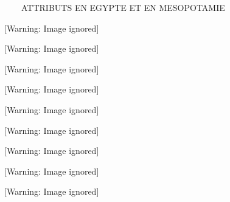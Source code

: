 \documentclass{article}
\title{}
\begin{document}
\ \ \ \ ATTRIBUTS EN EGYPTE ET EN MESOPOTAMIE\ \ 

\begin{center}
 [Warning: Image ignored] %

\end{center}
\begin{center}
 [Warning: Image ignored] %

\end{center}
\begin{center}
 [Warning: Image ignored] %

\end{center}
\begin{center}
 [Warning: Image ignored] %

\end{center}
\begin{center}
 [Warning: Image ignored] %

\end{center}
\begin{center}
 [Warning: Image ignored] %

\end{center}
\begin{center}
 [Warning: Image ignored] %

\end{center}
\begin{center}
 [Warning: Image ignored] %

\end{center}
\begin{center}
 [Warning: Image ignored] %

\end{center}
\end{document}
